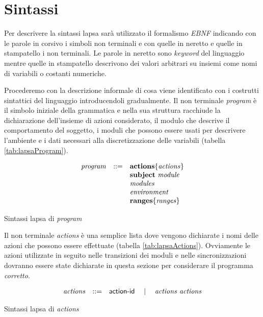 

\section{Sintassi}
Per descrivere la sintassi \ac{lapsa} sarà utilizzato il formalismo \emph{EBNF} indicando con le parole in corsivo i simboli non terminali e con quelle in neretto e quelle in stampatello i non terminali. Le parole in neretto sono \emph{keyword} del linguaggio mentre quelle in stampatello descrivono dei valori arbitrari su insiemi come nomi di variabili o costanti numeriche.

Procederemo con la descrizione informale di cosa viene identificato con i costrutti sintattici del linguaggio introducendoli gradualmente. Il non terminale \emph{program} è il simbolo iniziale della grammatica e nella sua struttura racchiude la dichiarazione dell'insieme di azioni considerato, il modulo che descrive il comportamento del soggetto, i moduli che possono essere usati per descrivere l'ambiente e i dati necessari alla discretizzazione delle variabili (tabella \ref{tab:lapsaProgram}).

\begin{table}[htbp!] %
$$
\begin{array}{rcl}
	\mathit{program} &::=& \mathbf{actions} \{ \mathit{actions} \} \\
		&& \mathbf{subject} \mbox{ } \mathit{module} \\
		&& \mathit{modules} \\
		&& \mathit{environment} \\
		&& \mathbf{ranges} \{ \mathit{ranges} \} \\
\end{array}
$$
\caption{Sintassi \ac{lapsa} di \emph{program}}
\label{tab:lapsaProgram}
\end{table}

Il non terminale \emph{actions} è una semplice lista dove vengono dichiarate i nomi delle azioni che possono essere effettuate (tabella \ref{tab:lapsaActions}). Ovviamente le azioni utilizzate in seguito nelle transizioni dei moduli e nelle sincronizzazioni dovranno essere state dichiarate in questa sezione per considerare il programma \emph{corretto}.

\begin{table}[htbp!] %
$$
\begin{array}{rcl}
	\mathit{actions} &::=& {\sf action}\textrm{-}{\sf id} \quad\mid\quad \mathit{actions} \mbox{ } \mathit{actions} \\
\end{array}
$$
\caption{Sintassi \ac{lapsa} di \emph{actions}}
\label{tab:lapsaActions}
\end{table}

